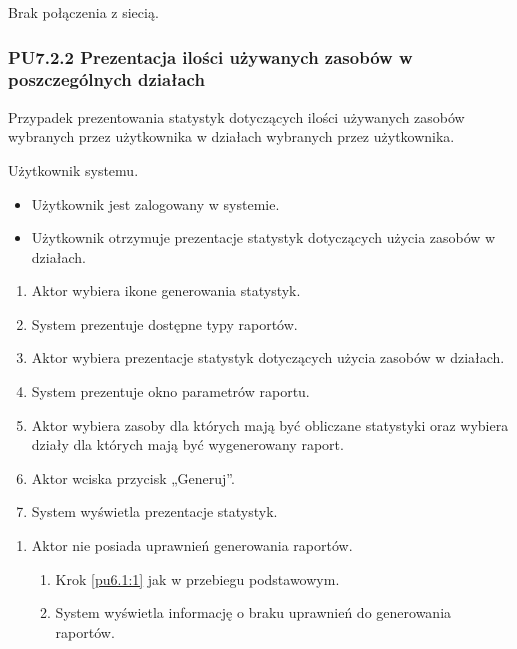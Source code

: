 Brak połączenia z siecią.

\subsubsection{PU7.2.2 Prezentacja ilości używanych zasobów w poszczególnych działach}
Przypadek prezentowania statystyk dotyczących ilości używanych zasobów wybranych przez użytkownika w działach wybranych przez użytkownika.

Użytkownik systemu.

\begin{itemize}
\item Użytkownik jest zalogowany w systemie.
\end{itemize}

\begin{itemize}
\item Użytkownik otrzymuje prezentacje statystyk dotyczących użycia zasobów w działach.
\end{itemize}

\begin{enumerate}
	\item \label{pu7.2.2:1} Aktor wybiera ikone generowania statystyk.
	\item System prezentuje dostępne typy raportów.
	\item \label{pu7.2.2:2} Aktor wybiera prezentacje statystyk dotyczących użycia zasobów w działach.
	\item System prezentuje okno parametrów raportu.
	\item Aktor wybiera zasoby dla których mają być obliczane statystyki oraz wybiera działy dla których mają być wygenerowany raport.
	\item Aktor wciska przycisk „Generuj”.
	\item System wyświetla prezentacje statystyk.
\end{enumerate}

\begin{enumerate}
	\item Aktor nie posiada uprawnień generowania raportów.
	\begin{enumerate}[label*=\arabic*.]
		\item Krok \ref{pu6.1:1} jak w przebiegu podstawowym.
		\item System wyświetla informację o braku uprawnień do generowania raportów.
	\end{enumerate}
\end{enumerate}

